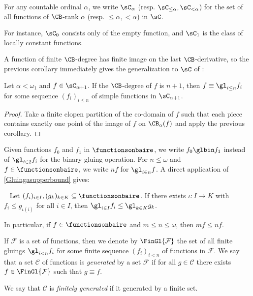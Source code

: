 For any countable ordinal $\alpha$, we write $\sC_\alpha$ (resp. $\sC_{\leq \alpha}, \sC_{<\alpha}$) for the set of all functions of $\CB$-rank $\alpha$ (resp. $\leq\alpha,<\alpha$) in $\sC$.

For instance, $\sC_0$ consists only of the empty function, and $\sC_1$ is the class of locally constant functions.

A function of finite $\CB$-degree has finite image on the last $\CB$-derivative, so the previous corollary immediately gives the generalization to $\sC$ of \cite[Lemma 4.3]{carroy2013quasi}:

\begin{corollary}\label{FiniteDegreeAreFinGl}
Let $\alpha<\omega_1$ and $f\in\sC_{\alpha+1}$.
If the $\CB$-degree of $f$ is $n+1$, then $f\equiv\gl_{i\leq n}f_i$ for some sequence $(f_i)_{i\leq n}$ of simple functions in $\sC_{\alpha+1}$.
\end{corollary}
\begin{proof}
Take a finite clopen partition of the co-domain of $f$ such that each piece contains exactly one point of the image of $f$ on $\CB_\alpha(f)$ and apply the previous corollary.
\end{proof}


Given functions $f_0$ and $f_1$ in $\functionsonbaire$, we write $f_0\glbin f_1$ instead of $\gl_{i\in 2}f_i$ for the binary gluing operation.
For $n\leq \omega$ and $f\in \functionsonbaire$, we write $nf$ for $\gl_{i\in n} f$.
A direct application of \cref{Gluingasupperbound} gives:

\begin{fact}\label{Gluingcohomomorphism}~
Let $(f_i)_{i\in I}, (g_k)_{k\in K} \subseteq \functionsonbaire$. If there exists $\iota:I\to K$ with $f_i\leq g_{\iota(i)}$ for all $i\in I$, then $\gl_{i\in I}f_i\leq \gl_{k\in K} g_k$. 

In particular, if $f\in\functionsonbaire$ and $m\leq n\leq \omega$, then $mf\leq nf$.
\end{fact}

\begin{definition}
If $\mathcal{F}$ is a set of functions, then we denote by $\FinGl{\mathcal{F}}$ the set of all finite gluings $\gl_{i< n} f_i$ for some finite sequence $(f_i)_{i<n}$ of functions in $\mathcal{F}$.
We say that a set $\mathcal{C}$ of functions is \emph{generated} by a set $\mathcal{F}$ if for all $g\in\mathcal{C}$ there exists $f\in \FinGl{\mathcal{F}}$ such that $g\equiv f$.

We say that $\mathcal{C}$ is \emph{finitely generated} if it generated by a finite set. 
\end{definition}

